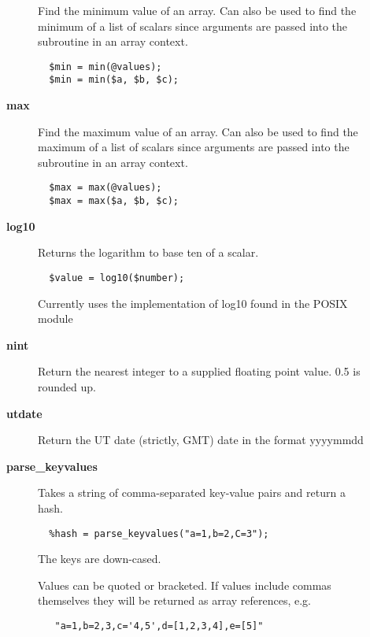 \begin{description}
\begin{description}
Find the minimum value of an array. Can also be used to find
the minimum of a list of scalars since arguments are passed into
the subroutine in an array context.

\begin{verbatim}
  $min = min(@values);
  $min = min($a, $b, $c);
\end{verbatim}

\item[{\textbf{max}}] \mbox{}

Find the maximum value of an array. Can also be used to find
the maximum of a list of scalars since arguments are passed into
the subroutine in an array context.

\begin{verbatim}
  $max = max(@values);
  $max = max($a, $b, $c);
\end{verbatim}

\item[{\textbf{log10}}] \mbox{}

Returns the logarithm to base ten of a scalar.

\begin{verbatim}
  $value = log10($number);
\end{verbatim}


Currently uses the implementation of log10 found in the
POSIX module


\item[{\textbf{nint}}] \mbox{}

Return the nearest integer to a supplied floating point
value. 0.5 is rounded up.


\item[{\textbf{utdate}}] \mbox{}

Return the UT date (strictly, GMT) date in the format yyyymmdd


\item[{\textbf{parse\_keyvalues}}] \mbox{}

Takes a string of comma-separated key-value pairs and return a hash.

\begin{verbatim}
  %hash = parse_keyvalues("a=1,b=2,C=3");
\end{verbatim}


The keys are down-cased.



Values can be quoted or bracketed. If values include commas themselves
they will be returned as array references, e.g.

\begin{verbatim}
   "a=1,b=2,3,c='4,5',d=[1,2,3,4],e=[5]"
\end{verbatim}



\end{description}
\end{description}
